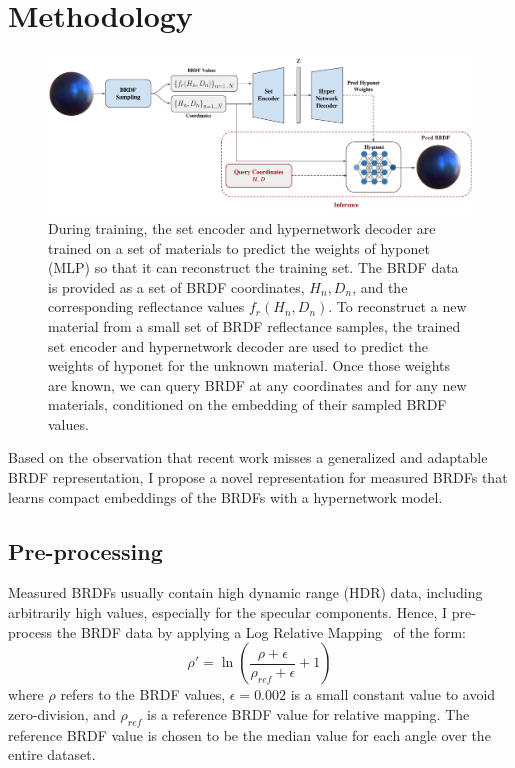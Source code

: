 \section{Methodology}

\begin{figure}[t]
  \centering

   \includegraphics[width=\linewidth]{Chapters/hyperbrdf-figs/MainFig_13_11.pdf}
   \caption{During training, the set encoder and hypernetwork decoder are trained on a set of materials to predict the weights of hyponet (MLP) so that it can reconstruct the training set. The BRDF data is provided as a set of BRDF coordinates, $H_n,D_n$, and the corresponding reflectance values $f_r(H_n,D_n)$. To reconstruct a new material from a small set of BRDF reflectance samples, the trained set encoder and hypernetwork decoder are used to predict the weights of hyponet for the unknown material. Once those weights are known, we can query BRDF at any coordinates and for any new materials, conditioned on the embedding of their sampled BRDF values.}
   \label{fig:mainfig} \end{figure}

Based on the observation that recent work misses a generalized and adaptable BRDF representation, I propose a novel representation for measured BRDFs that learns compact embeddings of the BRDFs with a hypernetwork model.

\subsection{Pre-processing}\label{sec:pre-proc}

Measured BRDFs usually contain high dynamic range (HDR) data, including arbitrarily high values, especially for the specular components. Hence, I pre-process the BRDF data by applying a Log Relative Mapping~\cite{nielsen2015optimal} of the form:
\begin{equation}
  \rho' = \ln{\left(\frac{\rho + \epsilon}{\rho_{ref} + \epsilon} +1\right)}
  \label{eq:preprocess}
\end{equation}
where $\rho$ refers to the BRDF values, $\epsilon = 0.002$ is a small constant value to avoid zero-division, and $\rho_{ref}$ is a reference BRDF value for relative mapping. The reference BRDF value is chosen to be the median value for each angle over the entire dataset.


